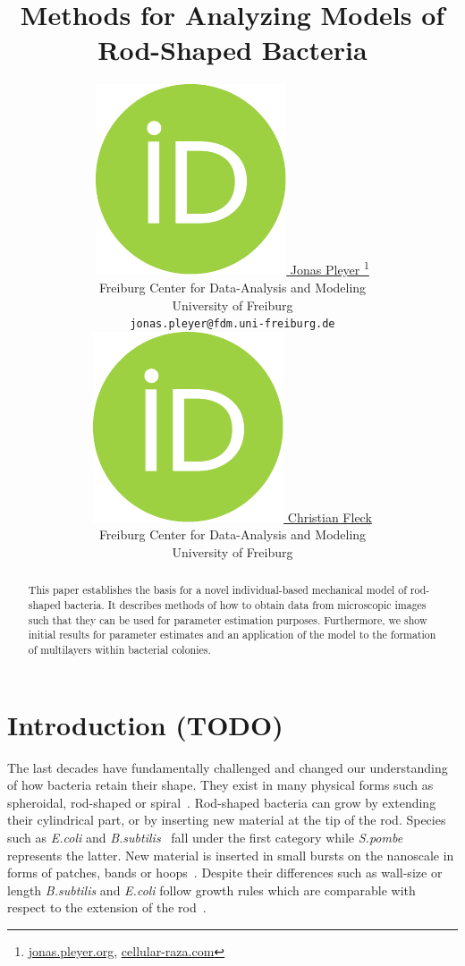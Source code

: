 \documentclass{article}
\title{Methods for Analyzing Models of Rod-Shaped Bacteria}
\author{
    \href{https://orcid.org/0009-0001-0613-7978}{
        \includegraphics[scale=0.06]{figures/orcid.pdf}
        \hspace{1mm}Jonas Pleyer
    }
    \thanks{
        \href{https://jonas.pleyer.org}{jonas.pleyer.org},
        \href{https://cellular-raza.com}{cellular-raza.com}
    }\\
	Freiburg Center for Data-Analysis and Modeling\\
	University of Freiburg\\
	\texttt{jonas.pleyer@fdm.uni-freiburg.de} \\
	\And
	\href{https://orcid.org/0000-0002-6371-4495}{
        \includegraphics[scale=0.06]{figures/orcid.pdf}
        \hspace{1mm}Christian Fleck
    }\\
	Freiburg Center for Data-Analysis and Modeling\\
	University of Freiburg
}
\begin{document}
\maketitle

\begin{abstract}
    This paper establishes the basis for a novel individual-based mechanical model of rod-shaped
    bacteria.
    It describes methods of how to obtain data from microscopic images such that they can be used
    for parameter estimation purposes.
    Furthermore, we show initial results for parameter estimates and an application of the model to
    the formation of multilayers within bacterial colonies.
\end{abstract}


\pagebreak
\renewcommand{\contentsname}{Table of Contents (remove before submission)}
\tableofcontents
\pagebreak

\section{Introduction (TODO)}
\label{section:introduction}

The last decades have fundamentally challenged and changed our understanding of how bacteria retain
their shape.
They exist in many physical forms such as spheroidal, rod-shaped or
spiral~\cite{Zapun2008,Young2006}.
Rod-shaped bacteria can grow by extending their cylindrical part, or by inserting new material at
the tip of the rod.
Species such as \textit{E.coli} and \textit{B.subtilis}~\cite{Errington2020} fall under the first
category while \textit{S.pombe} represents the latter.
New material is inserted in small bursts on the nanoscale in forms of patches, bands or
hoops~\cite{DePedro2003}.
Despite their differences such as wall-size or length \textit{B.subtilis} and \textit{E.coli} follow
growth rules which are comparable with respect to the extension of the rod~\cite{Chang2014}.
\end{document}
